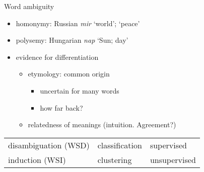 \documentclass[10pt]{beamer}%
\begin{document}
\begin{frame}{Word ambiguity}
  \begin{itemize}
    \item homonymy: Russian \emph{mir} `world'; `peace'
    \item polysemy: Hungarian \emph{nap} `Sun; day'
    \item evidence for differentiation
      \begin{itemize}
        \item etymology: common origin
          \begin{itemize}
            \item uncertain for many words
            \item how far back?
          \end{itemize}
        \item relatedness of meanings (intuition. Agreement?)
      \end{itemize}
  \end{itemize}
  \begin{tabular} {lll}
    \toprule
    disambiguation (WSD) & classification & supervised \\
    induction (WSI) \citep{Schutze:1998} & clustering & unsupervised \\
    \bottomrule
  \end{tabular}
\end{frame}
\end{document}
